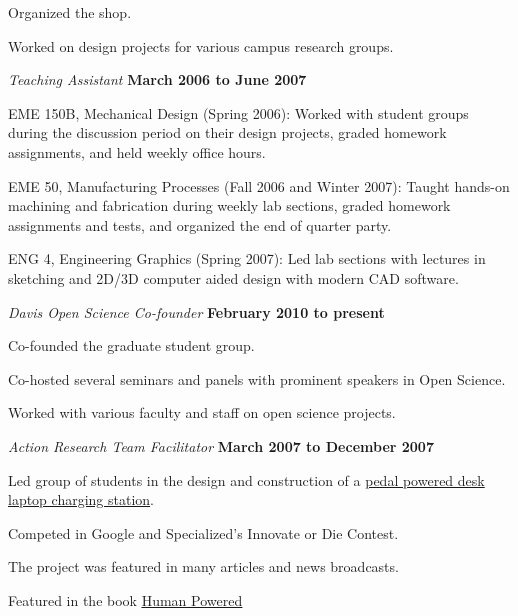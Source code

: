 \documentclass[10pt]{article}
\newenvironment{outerlist}[1][\enskip\textbullet]%
        {\begin{itemize}[#1]}{\end{itemize}%
         \vspace{-.6\baselineskip}}
\newenvironment{innerlist}[1][\enskip\textbullet]%
        {\begin{compactitem}[#1]}{\end{compactitem}}
\begin{document}
\begin{outerlist}
\begin{innerlist}
    \item Organized the shop.
    \item Worked on design projects for various campus research groups.
  \end{innerlist}
  \item[] \textit{Teaching Assistant}%
    \hfill \textbf{March 2006 to June 2007}
  \begin{innerlist}
    \item EME 150B, Mechanical Design (Spring 2006): Worked with student groups
        during the discussion period on their design projects, graded homework
        assignments, and held weekly office hours.
    \item EME 50, Manufacturing Processes (Fall 2006 and Winter 2007): Taught
        hands-on machining and fabrication during weekly lab sections, graded
        homework assignments and tests, and organized the end of quarter party.
    \item ENG 4, Engineering Graphics (Spring 2007): Led lab sections with
        lectures in sketching and 2D/3D computer aided design with modern CAD
        software.
  \end{innerlist}
  \item[] \textit{Davis Open Science Co-founder}%
    \hfill \textbf{February 2010 to present}
  \begin{innerlist}
    \item Co-founded the graduate student group.
    \item Co-hosted several seminars and panels with prominent speakers in Open
      Science.
    \item Worked with various faculty and staff on open science projects.
  \end{innerlist}
  \item[] \textit{Action Research Team Facilitator}%
        \hfill \textbf{March 2007 to December 2007}
  \begin{innerlist}
    \item Led group of students in the design and construction of a
        \href{http://mae.ucdavis.edu/~biosport/jkm/ped_desk.htm}{pedal powered
        desk laptop charging station}.
    \item Competed in Google and Specialized's Innovate or Die Contest.
    \item The project was featured in many articles and news broadcasts.
    \item Featured in the book
        \href{http://www.thehumanpoweredhome.com/}{\underline{Human Powered
}}
\end{innerlist}
\end{outerlist}
\end{document}
